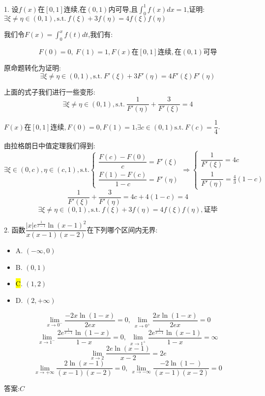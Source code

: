 1. 设$f(x)$在$[0,1]$连续,在$(0,1)$内可导,且$\int_{0}^{1}f(x)dx=1$,证明: $\exists \xi\neq \eta\in(0,1),\text{s.t.}\ f(\xi)+3f(\eta)=4f(\xi)f(\eta)$
\begin{solution}
	
	我们令$F(x)=\int_{0}^{x}f(t)dt$,我们有: 
	
	$$F(0)=0,\ F(1)=1,F(x)\text{在}[0,1]\text{连续},\text{在}(0,1)\text{可导}$$
	
	原命题转化为证明: 
	$$\exists \xi\neq \eta\in(0,1),\text{s.t.}\ F'(\xi)+3F'(\eta)=4F'(\xi)F'(\eta)$$
	
	上面的式子我们进行一些变形: 
	$$\exists \xi\neq \eta\in(0,1),\text{s.t.}\ \frac{1}{F'(\eta)}+\frac{3}{F'(\xi)}=4$$
	
	$F(x)\text{在}[0,1]\text{连续},F(0)=0,F(1)=1$,$\exists c\in(0,1)\text{s.t.}\ F(c)=\dfrac{1}{4}$.
	
	由拉格朗日中值定理我们得到: 
	$$\exists\xi\in(0,c),\eta\in(c,1), \text{s.t.}\left\lbrace 
	\begin{array}{l}
		\dfrac{F(c)-F(0)}{c}=F'(\xi)\\
		\dfrac{F(1)-F(c)}{1-c}=F'(\eta)
	\end{array}
	\right. \Rightarrow \left\lbrace 
	\begin{array}{l}
		\dfrac{1}{F'(\xi)}=4c\\
		\dfrac{1}{F'(\eta)}=\frac{4}{3}(1-c)
	\end{array}
	\right. $$
	$$\frac{1}{F'(\xi)}+\frac{3}{F'(\eta)}=4c+4(1-c)=4$$
	$$\exists \xi\neq \eta\in(0,1),\text{s.t.}\ f(\xi)+3f(\eta)=4f(\xi)f(\eta),\text{证毕}$$
\end{solution}

2. 函数$\dfrac{|x|e^{\frac{1}{x-1}}\ln(x-1)^2}{x(x-1)(x-2)}$在下列哪个区间内无界: 
\begin{itemize}
	\item A. $(-\infty,0)$ 
	\item B. $(0,1)$ 
	\item \hl{C}. $(1,2)$ 
	\item D. $(2,+\infty)$ 
\end{itemize}
\begin{solution}
	$$\lim\limits_{x\rightarrow 0^{-}}\frac{-2x\ln(1-x)}{2ex}=0,\ \lim\limits_{x\rightarrow 0^{+}}\frac{2x\ln(1-x)}{2ex}=0$$
	$$\lim\limits_{x\rightarrow 1^{-}}\frac{2e^{\frac{1}{x-1}}\ln(1-x)}{1-x}=0,\ \lim\limits_{x\rightarrow 1^{+}}\frac{2e^{\frac{1}{x-1}}\ln(x-1)}{1-x}=\infty$$
	$$\lim\limits_{x\rightarrow 2}\frac{2e\ln(x-1)}{x-2}=2e$$
	$$\lim\limits_{x\rightarrow +\infty}\frac{2\ln(x-1)}{(x-1)(x-2)}=0,\ \lim\limits_{x\rightarrow -\infty}\frac{-2\ln(1-)}{(x-1)(x-2)}=0$$
	
	答案:$C$
\end{solution}

